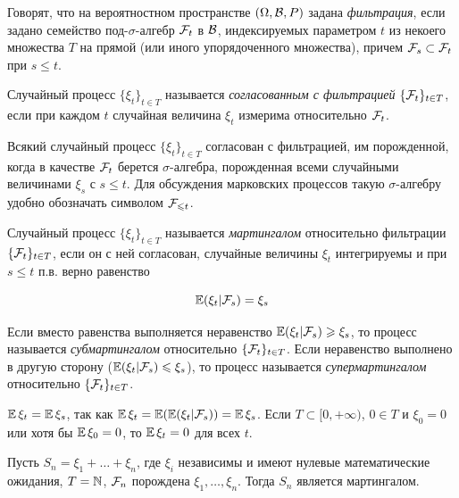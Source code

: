 \begin{definition}
    Говорят, что на вероятностном пространстве $(\Omega, \mathcal{B}, P)$ задана \textit{фильтрация}, если задано семейство под-$\sigma$-алгебр $\mathcal{F}_t$ в $\mathcal{B}$, индексируемых параметром $t$ из некоего множества $T$ на прямой (или иного упорядоченного множества), причем $\mathcal{F}_s \subset \mathcal{F}_t$ при $s \leq t$.
\end{definition}

\begin{definition}
    Случайный процесс $\{\xi_t\}_{t \in T}$ называется \textit{согласованным 
    с фильтрацией} $\{\mathcal{F}_t\}_{t \in T}$, если при каждом $t$ случайная величина 
    $\xi_ t$ измерима относительно $\mathcal{F}_t$.
\end{definition}

\begin{note}
    Всякий случайный процесс $\{\xi_t\}_{t \in T}$ согласован с фильтрацией, 
    им порожденной, когда в качестве $\mathcal{F}_t$ берется $\sigma$-алгебра, порожденная 
    всеми случайными величинами $\xi_s$ с $s \leq t$. Для обсуждения марковских процессов такую $\sigma$-алгебру удобно обозначать символом $\mathcal{F}_{\leqslant t}$.
\end{note}

\begin{definition}
    Случайный процесс $\{\xi_t\}_{t \in T}$ называется \textit{мартингалом}
    относительно фильтрации $\{\mathcal{F}_t\}_{t \in T}$, если он с ней согласован, случайные величины $\xi_t$ интегрируемы и при $s \leq t$ п.в. верно равенство

    \[
    \operatorname{\mathbb{E}}(\xi_t|\mathcal{F}_s) = \xi_s
    \]

    Если вместо равенства выполняется неравенство $\operatorname{\mathbb{E}}(\xi_t|\mathcal{F}_s) \geqslant \xi_s$, то 
    процесс называется \textit{субмартингалом} относительно $\{\mathcal{F}_t\}_{t \in T}$.
    Если неравенство выполнено в другую сторону ($\operatorname{\mathbb{E}}(\xi_t|\mathcal{F}_s) \leqslant \xi_s$), то
    процесс называется \textit{супермартингалом} относительно $\{\mathcal{F}_t\}_{t \in T}$.
\end{definition}

\begin{note}
    \(\operatorname{\mathbb{E}} \xi_t = \operatorname{\mathbb{E}} \xi_s\), так как \(\operatorname{\mathbb{E}} \xi_t = \operatorname{\mathbb{E}}(\operatorname{\mathbb{E}}(\xi_t|\mathcal{F}_s)) = \operatorname{\mathbb{E}} \xi_s\).
    Если $T \subset [0, +\infty)$, $0 \in T$ и $\xi_0 = 0$ или хотя бы $\operatorname{\mathbb{E}} \xi_0 = 0$, то $\operatorname{\mathbb{E}} \xi_t = 0$ для всех $t$.
\end{note}

\begin{example}[мартингала]
    Пусть $S_n = \xi_1 + \ldots + \xi_n$,
    где $\xi_i$ независимы и имеют нулевые математические ожидания, $T = \mathbb{N}$, 
    $\mathcal{F}_n$ порождена $\xi_1, \ldots, \xi_n$. Тогда $S_n$ является мартингалом. 
\end{example}

